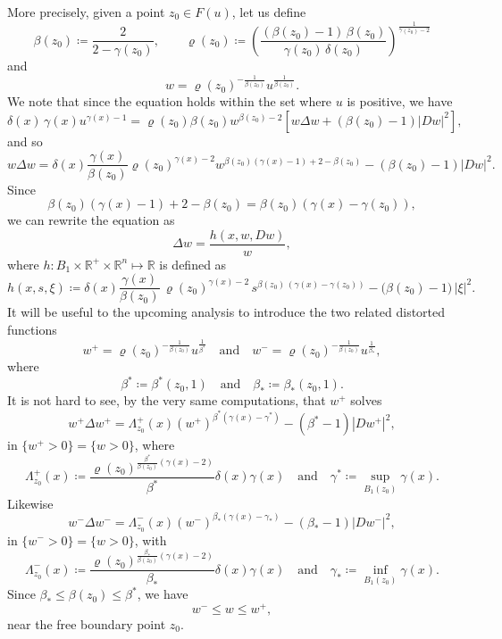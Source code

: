 \documentclass[reqno,11pt]{amsart}
\newcommand{\1}{\mathds{1}}
\numberwithin{equation}{section}
\begin{document}
More precisely, given a point $z_0 \in F(u)$, let us define
\[
\beta(z_0) \coloneqq \frac{2}{2 - \gamma(z_0)}, \qquad
\varrho(z_0) \coloneqq \left( \frac{(\beta(z_0)-1)\,\beta(z_0)}{\gamma(z_0)\,\delta(z_0)} \right)^{\tfrac{1}{\gamma(z_0)-2}}
\]
and
$$
    w = \varrho(z_0)^{-\frac{1}{\beta(z_0)}} u^{\frac{1}{\beta(z_0)}}.
$$
We note that since the equation holds within the set where $u$ is positive, we have
$$
    \delta(x)\, \gamma(x) u^{\gamma(x)-1} = \varrho(z_0) \beta(z_0) w^{\beta(z_0)-2} \left[w \Delta w + (\beta(z_0)-1)|Dw|^2 \right],
$$
and so
$$
    w\Delta w = \delta(x)\frac{\gamma(x)}{\beta(z_0)}\varrho(z_0)^{\gamma(x)-2}w^{\beta(z_0)(\gamma(x)-1)+2-\beta(z_0)} - (\beta(z_0)-1)|Dw|^2.
$$
Since
$$
    \beta(z_0)(\gamma(x)-1)+2-\beta(z_0) = \beta(z_0)(\gamma(x) - \gamma(z_0)),
$$
we can rewrite the equation as
\begin{equation}\label{eq almost linearized}
    \Delta w = \frac{h(x,w,Dw)}{w},
\end{equation}
where $h\colon B_1 \times \mathbb{R}^+ \times \mathbb{R}^n \mapsto \mathbb{R}$ is defined as
\begin{equation}\label{RHS of almost linear eq}
    h(x,s,\xi) \coloneqq \delta(x)\frac{\gamma(x)}{\beta(z_0)}
  \,\varrho(z_0)^{\gamma(x)-2}\,s^{\beta(z_0)\,(\gamma(x)-\gamma(z_0))}
  - \bigl(\beta(z_0)-1\bigr)\,|\xi|^2.
\end{equation}
It will be useful to the upcoming analysis to introduce the two related distorted functions
\begin{equation}\label{extremal functions}
    w^+ = \varrho(z_0)^{-\frac{1}{\beta(z_0)}} u^{\frac{1}{\beta^\ast}} \quad \text{and} \quad w^- = \varrho(z_0)^{-\frac{1}{\beta(z_0)}} u^{\frac{1}{\beta
    _\ast}},
\end{equation}
where
$$
   \beta^\ast \coloneqq \beta^\ast(z_0,1) \quad \text{and} \quad  \beta_\ast \coloneqq \beta_\ast(z_0,1).
$$
It is not hard to see, by the very same computations, that $w^+$ solves
$$
    w^+\Delta w^+ = \Lambda^+_{z_0}(x)(w^+)^{\beta^\ast(\gamma(x)-\gamma^\ast)} - (\beta^\ast - 1)|Dw^+|^2,
$$
in $\{w^+ >0\} = \{w>0\}$, where
$$
    \Lambda^+_{z_0}(x) \coloneqq \frac{\varrho(z_0)^{\frac{\beta^\ast}{\beta(z_0)}(\gamma(x)-2)}}{\beta^\ast}\delta(x)\gamma(x) \quad \text{and} \quad \gamma^\ast \coloneqq \sup_{B_1(z_0)} \gamma(x).
$$
Likewise
$$
    w^-\Delta w^- = \Lambda^-_{z_0}(x)(w^-)^{\beta_\ast(\gamma(x)-\gamma_\ast)} - (\beta_\ast - 1)|Dw^-|^2,
$$
in $\{w^- >0\} = \{w>0\}$, with
$$
    \Lambda^-_{z_0}(x) \coloneqq \frac{\varrho(z_0)^{\frac{\beta_\ast}{\beta(z_0)}(\gamma(x)-2)}}{\beta_\ast}\delta(x)\gamma(x) \quad \text{and} \quad \gamma_\ast \coloneqq \inf_{B_1(z_0)} \gamma(x).
$$
Since $\beta_\ast \leq \beta(z_0) \leq \beta^\ast$, we have
$$
    w^- \leq w \leq w^+,
$$
near the free boundary point $z_0$.
\end{document}

